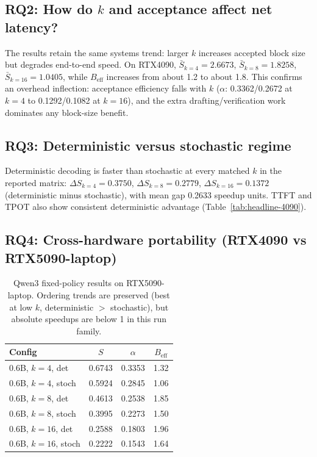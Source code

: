 \subsection{RQ2: How do $k$ and acceptance affect net latency?}

The results retain the same systems trend: larger $k$ increases
accepted block size but degrades end-to-end speed.
On RTX4090,
$\bar{S}_{k=4}=2.6673$, $\bar{S}_{k=8}=1.8258$, $\bar{S}_{k=16}=1.0405$,
while $B_{\text{eff}}$ increases from about 1.2 to about 1.8.
This confirms an overhead inflection: acceptance efficiency falls with $k$
($\alpha$: 0.3362/0.2672 at $k{=}4$ to 0.1292/0.1082 at $k{=}16$), and the
extra drafting/verification work dominates any block-size benefit.

\subsection{RQ3: Deterministic versus stochastic regime}

Deterministic decoding is faster than stochastic at every matched $k$ in the
reported matrix:
$\Delta S_{k=4}{=}0.3750$, $\Delta S_{k=8}{=}0.2779$,
$\Delta S_{k=16}{=}0.1372$ (deterministic minus stochastic),
with mean gap 0.2633 speedup units.
TTFT and TPOT also show consistent deterministic advantage
(Table~\ref{tab:headline-4090}).

\subsection{RQ4: Cross-hardware portability (RTX4090 vs RTX5090-laptop)}

\begin{table}[t]
\centering
\caption{Qwen3 fixed-policy results on RTX5090-laptop.
Ordering trends are preserved (best at low $k$, deterministic $>$ stochastic),
but absolute speedups are below 1 in this run family.}
\label{tab:headline-5090}
\small
\begin{tabular}{l c c c}
\hline
\textbf{Config} & $S$ & $\alpha$ & $B_{\text{eff}}$ \\
\hline
0.6B, $k{=}4$, det   & 0.6743 & 0.3353 & 1.32 \\
0.6B, $k{=}4$, stoch & 0.5924 & 0.2845 & 1.06 \\
0.6B, $k{=}8$, det   & 0.4613 & 0.2538 & 1.85 \\
0.6B, $k{=}8$, stoch & 0.3995 & 0.2273 & 1.50 \\
0.6B, $k{=}16$, det  & 0.2588 & 0.1803 & 1.96 \\
0.6B, $k{=}16$, stoch& 0.2222 & 0.1543 & 1.64 \\
\hline
\end{tabular}
\end{table}

